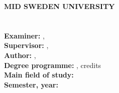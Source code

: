 \documentclass[../main.tex]{subfiles}
\begin{document}
\vspace*{160mm}

\fontsize{11}{14.5}\selectfont
\noindent
\textbf{MID SWEDEN UNIVERSITY}\\
\Division\\
\\
\textbf{Examiner:} \Examiner, \ExaminerEmail\\
\textbf{Supervisor:} \Supervisor, \SupervisorEmail\\
\textbf{Author:} \Author, \AuthorEmail\\
\textbf{Degree programme:} \Programme, \Credits{} credits\\
\textbf{Main field of study:} \MainFieldOfStudy \\
\textbf{Semester, year:} \Semester
\end{document}
